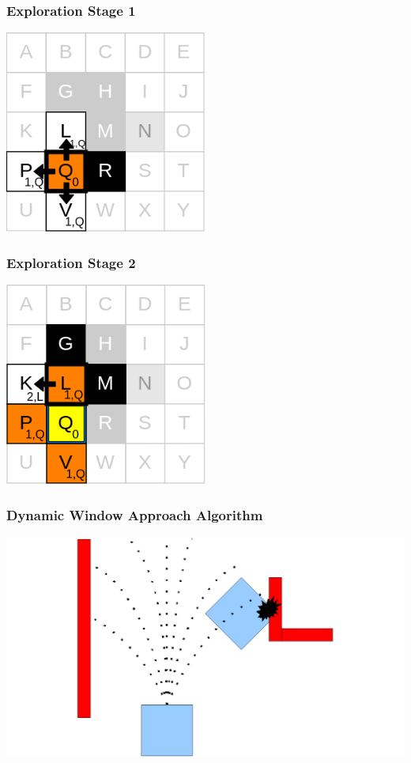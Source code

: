 \documentclass{beamer}
\begin{document}
\begin{frame}
    \frametitle{Exploration Stage 1}
    \includegraphics[width=0.5\textwidth]{images/grid_map_expansion_02.png}
\end{frame}

\begin{frame}
    \frametitle{Exploration Stage 2}
    \includegraphics[width=0.5\textwidth]{images/grid_map_expansion_03.png}
\end{frame}

\begin{frame}
    \frametitle{Dynamic Window Approach Algorithm}
    \includegraphics[width=\textwidth]{images/dwa_planner.png}
\end{frame}
\end{document}
